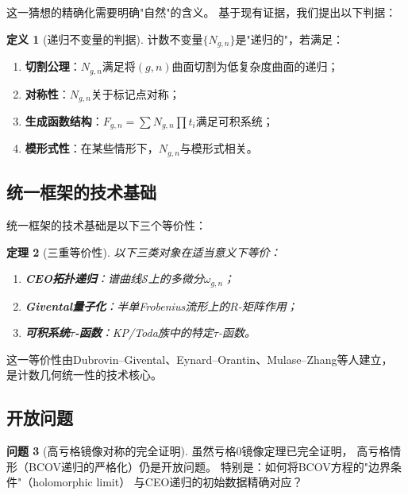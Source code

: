 \documentclass[11pt,a4paper]{article}
\theoremstyle{plain}
\newtheorem{theorem}{定理}[section]
\theoremstyle{definition}
\newtheorem{definition}[theorem]{定义}
\newtheorem{problem}[theorem]{问题}
\begin{document}
这一猜想的精确化需要明确"自然"的含义。
基于现有证据，我们提出以下判据：

\begin{definition}[递归不变量的判据]\label{crit:recursive}
计数不变量$\{N_{g,n}\}$是"递归的"，若满足：
\begin{enumerate}[label=(\roman*)]
\item \textbf{切割公理}：$N_{g,n}$满足将$(g,n)$曲面切割为低复杂度曲面的递归；
\item \textbf{对称性}：$N_{g,n}$关于标记点对称；
\item \textbf{生成函数结构}：$F_{g,n} = \sum N_{g,n} \prod t_i$满足可积系统；
\item \textbf{模形式性}：在某些情形下，$N_{g,n}$与模形式相关。
\end{enumerate}
\end{definition}

\subsection{统一框架的技术基础}

统一框架的技术基础是以下三个等价性：

\begin{theorem}[三重等价性]\label{thm:triple}
以下三类对象在适当意义下等价：
\begin{enumerate}[label=(\arabic*)]
\item \textbf{CEO拓扑递归}：谱曲线$\mathcal{S}$上的多微分$\omega_{g,n}$；
\item \textbf{Givental量子化}：半单Frobenius流形上的$R$-矩阵作用；
\item \textbf{可积系统$\tau$-函数}：KP/Toda族中的特定$\tau$-函数。
\end{enumerate}
\end{theorem}

这一等价性由Dubrovin--Givental、Eynard--Orantin、Mulase--Zhang等人建立，
是计数几何统一性的技术核心。

\subsection{开放问题}

\begin{problem}[高亏格镜像对称的完全证明]\label{prob:mirror}
虽然亏格0镜像定理已完全证明，
高亏格情形（BCOV递归的严格化）仍是开放问题。
特别是：如何将BCOV方程的"边界条件"（holomorphic limit）
与CEO递归的初始数据精确对应？
\end{problem}
\end{document}
